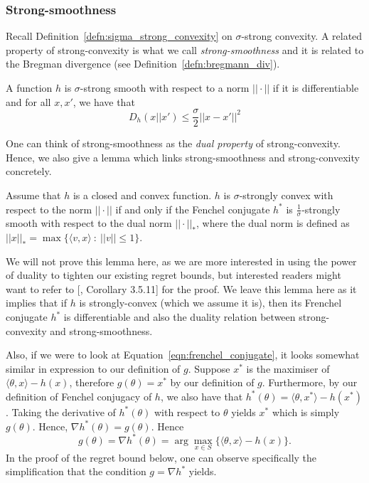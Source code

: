 \subsubsection{Strong-smoothness}
Recall Definition~\ref{defn:sigma_strong_convexity} on $\sigma$-strong convexity. A related property of strong-convexity is what we call \textit{strong-smoothness} and it is related to the Bregman divergence (see Definition~\ref{defn:bregmann_div}).
\begin{define}
    A function $h$ is $\sigma$-strong smooth with respect to a norm $||\cdot||$ if it is differentiable and for all $x, x'$, we have that
    \begin{equation}
        D_h(x||x') \leq \frac{\sigma}{2}||x - x'||^2
    \end{equation}
\end{define}
\noindent One can think of strong-smoothness as the \textit{dual property} of strong-convexity. Hence, we also give a lemma which links strong-smoothness and strong-convexity concretely.
\begin{lemma}\label{lem:strong_convexity_strong_smoothness_duality}
    Assume that $h$ is a closed and convex function. $h$ is $\sigma$-strongly convex with respect to the norm $||\cdot||$ if and only if the Fenchel conjugate $h^*$ is $\frac{1}{\sigma}$-strongly smooth with respect to the dual norm $||\cdot||_*$, where the dual norm is defined as $||x||_* = \max\{ \langle v, x \rangle \  : \ ||v|| \leq 1 \} $.
\end{lemma}
\noindent We will not prove this lemma here, as we are more interested in using the power of duality to tighten our existing regret bounds, but interested readers might want to refer to [\cite{zualinescu2002convex}, Corollary 3.5.11] for the proof. We leave this lemma here as it implies that if $h$ is strongly-convex (which we assume it is), then its Frenchel conjugate $h^*$ is differentiable and also the duality relation between strong-convexity and strong-smoothness.

Also, if we were to look at Equation~\ref{eqn:frenchel_conjugate}, it looks somewhat similar in expression to our definition of $g$. Suppose $x^*$ is the maximiser of $\langle \theta, x\rangle -h(x)$, therefore $g(\theta) = x^*$ by our definition of $g$. Furthermore, by our definition of Fenchel conjugacy of $h$, we also have that $h^*(\theta) = \langle \theta, x^*\rangle -h(x^*)$. Taking the derivative of $h^*(\theta)$ with respect to $\theta$ yields $x^*$ which is simply $g(\theta)$. Hence, $\nabla h^*(\theta) = g(\theta)$. Hence
\begin{equation}
    g(\theta) = \nabla h^*(\theta) = \arg\max_{x \in S} \{\langle \theta, x\rangle - h(x)\}.
\end{equation}
In the proof of the regret bound below, one can observe specifically the simplification that the condition $g = \nabla h^*$ yields.


